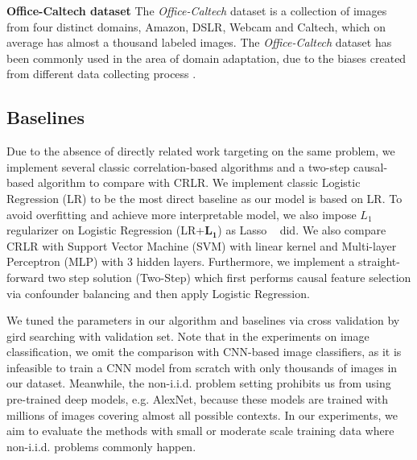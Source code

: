 \documentclass[sigconf]{acmart}
\begin{document}
\textbf{Office-Caltech dataset}
The \emph{Office-Caltech} dataset is a collection of images from four distinct domains, Amazon, DSLR, Webcam and Caltech, which on average has almost a thousand labeled images.
The \emph{Office-Caltech} dataset has been commonly used in the area of domain adaptation, due to the biases created from different data collecting process \cite{torralba2011unbiased}.

\subsection{Baselines}
Due to the absence of directly related work targeting on the same problem, we implement several classic correlation-based algorithms and a two-step causal-based algorithm  to compare with CRLR.
We implement classic Logistic Regression (LR) to be the most direct baseline as our model is based on LR.
To avoid overfitting and achieve more interpretable model, we also impose $L_1$ regularizer on Logistic Regression (LR+$\bm{L_1}$) as Lasso ~\cite{tibshirani1996regression} did.
We also compare CRLR with Support Vector Machine (SVM) with linear kernel and  Multi-layer Perceptron (MLP) with 3 hidden layers.
Furthermore, we implement a straight-forward two step solution (Two-Step) which first performs causal feature selection via confounder balancing \cite{athey2016approximate} and then apply Logistic Regression.

We tuned the parameters in our algorithm and baselines via cross validation by gird searching with validation set.
Note that in the experiments on image classification, we omit the comparison with CNN-based image classifiers, as it is infeasible to train a CNN model from scratch with only thousands of images in our dataset.
Meanwhile, the non-i.i.d. problem setting prohibits us from using pre-trained deep models, e.g. AlexNet, because these models are trained with millions of images covering almost all possible contexts.
In our experiments, we aim to evaluate the methods with small or moderate scale training data where non-i.i.d. problems commonly happen.
\end{document}
